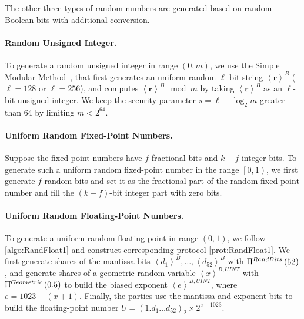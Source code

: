 The other three types of random numbers are generated based on random Boolean bits with additional conversion.

\paragraph{Random Unsigned Integer.}
To generate a random unsigned integer in range $\left(0,m\right) $, we use the Simple Modular Method~\cite{NISTRandomNumber2015}, that first generates an uniform random $\ell$-bit string $\left\langle \boldsymbol{r}\right\rangle^B $ ($\ell=128$ or $\ell=256$), and computes $ \left\langle \boldsymbol{r}\right\rangle^B \mod m$ by taking $\left\langle \boldsymbol{r}\right\rangle^B $ as an $\ell$-bit unsigned integer. We keep the security parameter $s=\ell-\log_2 m$ greater than $64$ by limiting $m<2^{64}$.

\paragraph{Uniform Random Fixed-Point Numbers.}
Suppose the fixed-point numbers have $f$ fractional bits and $k-f$ integer bits.
To generate such a uniform random fixed-point number in the range $\left[0,1\right)$, we first generate $f$ random bits and set it as the fractional part of the random fixed-point number and fill the $\left(k-f\right) $-bit integer part with zero bits.

                  \paragraph{Uniform Random Floating-Point Numbers.}
                  To generate a uniform random floating point in range $\left(0,1\right) $, we follow \autoref{algo:RandFloat1} and construct corresponding \smpc protocol \autoref{prot:RandFloat1}.
                  We first generate shares of the mantissa bits $\left\langle d_{1}\right\rangle^{B}, \ldots ,\left\langle d_{52}\right\rangle ^{B} $ with $\Uppi^{RandBits}\left(52\right) $, and generate shares of a geometric random variable $\left\langle {x}\right\rangle^{B,UINT} $ with $\Uppi^{Geometric}\left(0.5\right) $ to build the biased exponent $\left\langle {e}\right\rangle^{B,UINT}$, where $e=1023-\left(x+1\right) $. Finally, the parties use the mantissa and exponent bits to build the floating-point number $U=\left(1.d_{1} \ldots d_{52}\right)_{2} \times 2^{e -1023} $.

